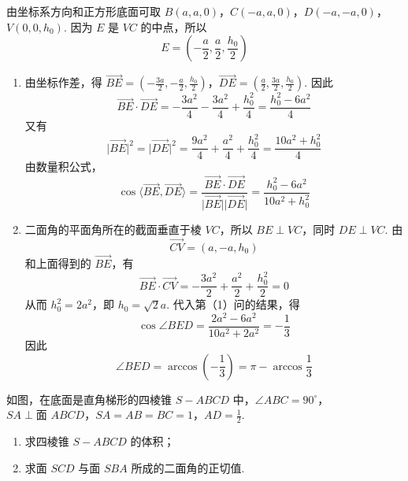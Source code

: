 \begin{solution}
由坐标系方向和正方形底面可取
\(B(a,a,0)\)，\(C(-a,a,0)\)，\(D(-a,-a,0)\)，\(V(0,0,h_0)\).
因为 \(E\) 是 \(VC\) 的中点，所以
\[
E=\left(-\frac a2,\frac a2,\frac{h_0}{2}\right)
\]
\begin{enumerate}
\item 由坐标作差，得
\(\overrightarrow{BE}=\left(-\frac{3a}{2},-\frac a2,\frac{h_0}{2}\right)\)，\(\overrightarrow{DE}=\left(\frac a2,\frac{3a}{2},\frac{h_0}{2}\right)\).
因此
\[
\overrightarrow{BE}\cdot\overrightarrow{DE}
=-\frac{3a^2}{4}-\frac{3a^2}{4}+\frac{h_0^2}{4}
=\frac{h_0^2-6a^2}{4}
\]
又有
\[
\lvert\overrightarrow{BE}\rvert^2=\lvert\overrightarrow{DE}\rvert^2
=\frac{9a^2}{4}+\frac{a^2}{4}+\frac{h_0^2}{4}
=\frac{10a^2+h_0^2}{4}
\]
由数量积公式，
\[
\cos\langle\overrightarrow{BE},\overrightarrow{DE}\rangle
=\frac{\overrightarrow{BE}\cdot\overrightarrow{DE}}{\lvert\overrightarrow{BE}\rvert\lvert\overrightarrow{DE}\rvert}
=\frac{h_0^2-6a^2}{10a^2+h_0^2}
\]

\item 二面角的平面角所在的截面垂直于棱 \(VC\)，所以 \(BE\perp VC\)，同时 \(DE\perp VC\). 由
\[
\overrightarrow{CV}=(a,-a,h_0)
\]
和上面得到的 \(\overrightarrow{BE}\)，有
\[
\overrightarrow{BE}\cdot\overrightarrow{CV}
=-\frac{3a^2}{2}+\frac{a^2}{2}+\frac{h_0^2}{2}=0
\]
从而 \(h_0^2=2a^2\)，即 \(h_0=\sqrt2a\). 代入第（1）问的结果，得
\[
\cos\angle BED
=\frac{2a^2-6a^2}{10a^2+2a^2}=-\frac13
\]
因此
\[
\angle BED=\arccos\left(-\frac13\right)=\pi-\arccos\frac13
\]
\end{enumerate}
\end{solution}

\reuseproblemnumber
\begin{problem}[乙]
如图，在底面是直角梯形的四棱锥 \(S-ABCD\) 中，\(\angle ABC=90^\circ\)，\(SA\perp\text{面 }ABCD\)，\(SA=AB=BC=1\)，\(AD=\frac12\).

\begin{enumerate}
\item 求四棱锥 \(S-ABCD\) 的体积；
\item 求面 \(SCD\) 与面 \(SBA\) 所成的二面角的正切值.
\end{enumerate}

\end{problem}

